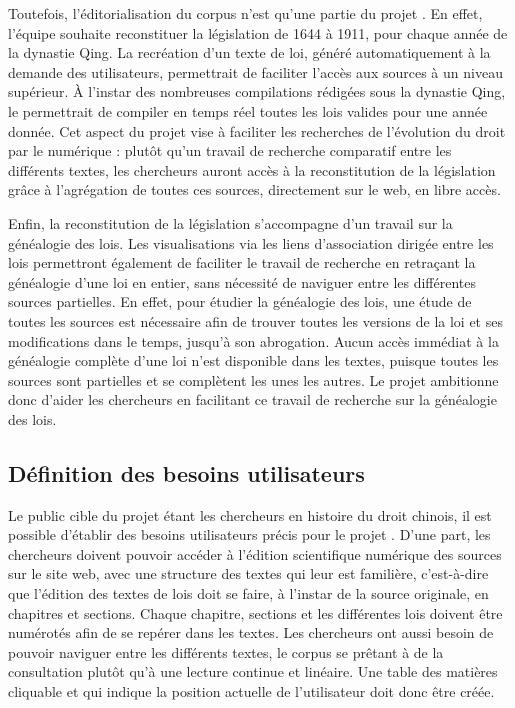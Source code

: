 Toutefois, l'éditorialisation du corpus n'est qu'une partie du projet \COREL. En effet, l'équipe souhaite reconstituer la législation de 1644 à 1911, pour chaque année de la dynastie Qing. La recréation d'un texte de loi, généré automatiquement à la demande des utilisateurs, permettrait de faciliter l'accès aux sources à un niveau supérieur. À l'instar des nombreuses compilations rédigées sous la dynastie Qing, le \cv permettrait de compiler en temps réel toutes les lois valides pour une année donnée. Cet aspect du projet vise à faciliter les recherches de l'évolution du droit par le numérique : plutôt qu'un travail de recherche comparatif entre les différents textes, les chercheurs auront accès à la reconstitution de la législation grâce à l'agrégation de toutes ces sources, directement sur le web, en libre accès. 

Enfin, la reconstitution de la législation s'accompagne d'un travail sur la généalogie des lois. Les visualisations via les liens d'association dirigée entre les lois permettront également de faciliter le travail de recherche en retraçant la généalogie d'une loi en entier, sans nécessité de naviguer entre les différentes sources partielles. En effet, pour étudier la généalogie des lois, une étude de toutes les sources est nécessaire afin de trouver toutes les versions de la loi et ses modifications dans le temps, jusqu'à son abrogation. Aucun accès immédiat à la généalogie complète d'une loi n'est disponible dans les textes, puisque toutes les sources sont partielles et se complètent les unes les autres. Le projet \COREL ambitionne donc d'aider les chercheurs en facilitant ce travail de recherche sur la généalogie des lois. 

\subsection{Définition des besoins utilisateurs}

Le public cible du projet étant les chercheurs en histoire du droit chinois, il est possible d'établir des besoins utilisateurs précis pour le projet \COREL. D'une part, les chercheurs doivent pouvoir accéder à l'édition scientifique numérique des sources sur le site web, avec une structure des textes qui leur est familière, c'est-à-dire que l'édition des textes de lois doit se faire, à l'instar de la source originale, en chapitres et sections. Chaque chapitre, sections et les différentes lois doivent être numérotés afin de se repérer dans les textes. Les chercheurs ont aussi besoin de pouvoir naviguer entre les différents textes, le corpus se prêtant à de la consultation plutôt qu'à une lecture continue et linéaire. Une table des matières cliquable et qui indique la position actuelle de l'utilisateur doit donc être créée. 


